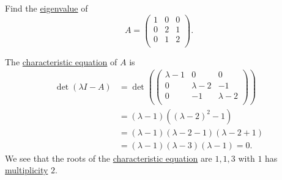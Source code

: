 \begin{eg}
	Find the \hyperref[def:eigenvalue]{eigenvalue} of
	\[
		A = \begin{pmatrix}
			1 & 0 & 0 \\
			0 & 2 & 1 \\
			0 & 1 & 2 \\
		\end{pmatrix}.
	\]
\end{eg}
\begin{explanation}
	The \hyperref[note:characteristic-equation]{characteristic equation} of \(A\) is
	\[
		\begin{split}
			\det(\lambda I - A) &= \det \left(  \begin{pmatrix}
				\lambda - 1 & 0            & 0             \\
				0           & \lambda -  2 & -1            \\
				0           & -1           & \lambda -   2 \\
			\end{pmatrix}\right)\\
			&= (\lambda - 1)((\lambda - 2 )^2 - 1)\\
			&= (\lambda - 1)(\lambda - 2 - 1)(\lambda - 2 + 1)\\
			&= (\lambda - 1)(\lambda - 3)(\lambda - 1) = 0.
		\end{split}
	\]
	We see that the roots of the \hyperref[note:characteristic-equation]{characteristic equation} are \(1, 1, 3\) with
	\(1\) has \hyperref[def:multiplicity]{multiplicity} \(2\).
\end{explanation}

